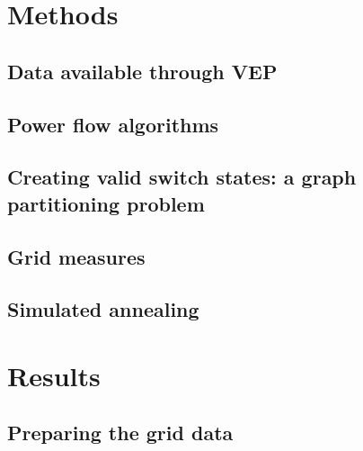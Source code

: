 \documentclass[a4paper]{report}
\begin{document}


\chapter{Methods}

\section{Data available through VEP}



\section{Power flow algorithms}\label{sec:methods:pf}



\section{Creating valid switch states: a graph partitioning problem}





\section{Grid measures}\label{sec:measures}



\section{Simulated annealing}



\chapter{Results}

\section{Preparing the grid data}
\end{document}
